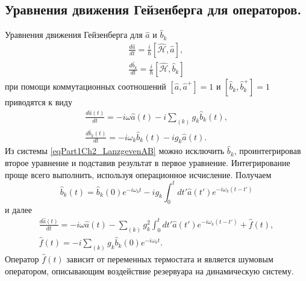 \subsection{Уравнения движения Гейзенберга для операторов.}
Уравнения движения Гейзенберга для $\hat{a}$ и $\hat{b}_{k}$
\begin{eqnarray}
\frac{d \hat{a}}{d t} = \frac{i}{\hbar}\left[
 \hat{\mathcal{H}}, \hat{a}
\right],
\nonumber \\
\frac{d \hat{b}_k}{d t} = \frac{i}{\hbar}\left[
 \hat{\mathcal{H}}, \hat{b}_k
\right]
\nonumber
\end{eqnarray}
при помощи коммутационных соотношений 
$\left[\hat{a}, \hat{a}^{+}\right] = 1$ и 
$\left[\hat{b}_k, \hat{b}_{k}^{+}\right] = 1$ приводятся к виду
\begin{eqnarray}
\frac{d \hat{a}\left(t\right)}{d t} = -i \omega \hat{a}\left(t\right) - i\sum_{(k)}g_k
\hat{b}_k\left(t\right),
\nonumber \\
\frac{d \hat{b}_k\left(t\right)}{d t} = -i \omega_k
\hat{b}_{k}\left(t\right) - i g_k \hat{a}\left(t\right).
\label{eqPart1Ch2_LanzgevenAB}
\end{eqnarray}
Из системы \eqref{eqPart1Ch2_LanzgevenAB} можно исключить $\hat{b}_k$,
проинтегрировав второе уравнение и подставив результат в первое
уравнение. Интегрирование проще всего выполнить, используя операционное
исчисление. Получаем
\begin{equation}
\hat{b}_k\left(t\right) = 
\hat{b}_k\left(0\right) e^{-i \omega_k t} 
- i g_k \int_0^t d t' \hat{a}\left(t'\right)e^{-i \omega_k\left(t - t'\right)}
\nonumber
\end{equation}
и далее
\begin{eqnarray}
\frac{d \hat{a}\left(t\right)}{dt} = 
- i \omega \hat{a}\left(t\right) - \sum_{(k)} g_k^2 \int_0^t
d t'  \hat{a}\left(t'\right)e^{-i \omega_k\left(t - t'\right)}
+ \hat{f}\left(t\right),
\nonumber \\
\hat{f}\left(t\right) = -i \sum_{(k)} g_k \hat{b}_k\left(0\right)
e^{-i \omega_k t}.
\label{eqPart1Ch2_LanzgevenA}
\end{eqnarray}
Оператор $\hat{f}\left(t\right)$ зависит от переменных термостата и
является шумовым оператором, описывающим воздействие резервуара на
динамическую систему.

